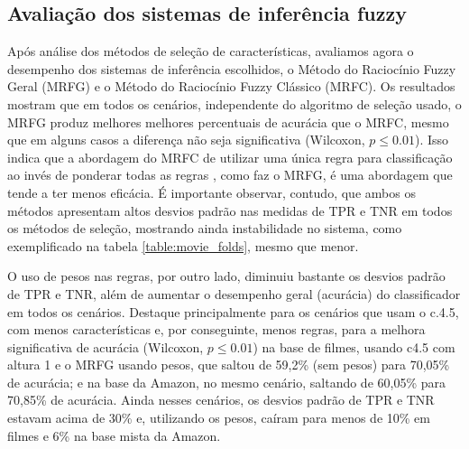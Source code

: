 \documentclass[template.tex]{subfiles}
\begin{document}

\subsection{Avaliação dos sistemas de inferência fuzzy}

Após análise dos métodos de seleção de características, avaliamos agora o desempenho dos sistemas de inferência escolhidos, o Método do Raciocínio Fuzzy Geral (MRFG) e o Método do Raciocínio Fuzzy Clássico (MRFC). Os resultados mostram que em todos os cenários, independente do algoritmo de seleção usado, o MRFG produz melhores melhores percentuais de acurácia que o MRFC, mesmo que em alguns casos a diferença não seja significativa (Wilcoxon, $p\leq0.01$). Isso indica que a abordagem do MRFC de utilizar uma única regra para classificação ao invés de ponderar todas as regras , como faz o MRFG, é uma abordagem que tende a ter menos eficácia. É importante observar, contudo, que ambos os métodos apresentam altos desvios padrão nas medidas de TPR e TNR em todos os métodos de seleção, mostrando ainda instabilidade no sistema, como exemplificado na tabela \ref{table:movie_folds}, mesmo que menor. 

O uso de pesos nas regras, por outro lado, diminuiu bastante os desvios padrão de TPR e TNR, além de aumentar o desempenho geral (acurácia) do classificador em todos os cenários. Destaque principalmente para os cenários que usam o c.4.5, com menos características e, por conseguinte, menos regras, para a melhora significativa de acurácia (Wilcoxon, $p\leq0.01$) na base de filmes, usando c4.5 com altura 1 e o MRFG usando pesos, que saltou de 59,2\% (sem pesos) para 70,05\% de acurácia; e na base da Amazon, no mesmo cenário, saltando de 60,05\% para 70,85\% de acurácia. Ainda nesses cenários, os desvios padrão de TPR e TNR estavam acima de 30\% e, utilizando os pesos, caíram para menos de 10\% em filmes e 6\% na base mista da Amazon.
\end{document}
